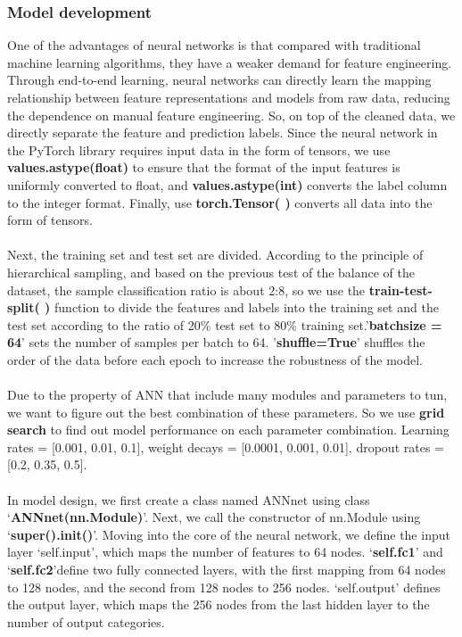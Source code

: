 \documentclass[10pt]{article}
\begin{document}
\subsubsection{Model development}
One of the advantages of neural networks is that compared with traditional machine learning algorithms, they have a weaker demand for feature engineering. Through end-to-end learning, neural networks can directly learn the mapping relationship between feature representations and models from raw data, reducing the dependence on manual feature engineering. So, on top of the cleaned data, we directly separate the feature and prediction labels. Since the neural network in the PyTorch library requires input data in the form of tensors, we use \textbf{values.astype(float)} to ensure that the format of the input features is uniformly converted to float, and \textbf{values.astype(int)} converts the label column to the integer format. Finally, use  \textbf{torch.Tensor( )} converts all data into the form of tensors.
\\\\
Next, the training set and test set are divided. According to the principle of hierarchical sampling, and based on the previous test of the balance of the dataset, the sample classification ratio is about 2:8, so we use the \textbf{train-test-split( )} function to divide the features and labels into the training set and the test set according to the ratio of 20\% test set to 80\% training set.'\textbf{batchsize = 64}' sets the number of samples per batch to 64. '\textbf{shuffle=True}' shuffles the order of the data before each epoch to increase the robustness of the model.
\\\\
Due to the property of ANN that include many modules and parameters to tun, we want to figure out the best combination of these parameters. So we use \textbf{grid search} to find out model performance on each parameter combination. Learning rates = [0.001, 0.01, 0.1], weight decays = [0.0001, 0.001, 0.01], dropout rates = [0.2, 0.35, 0.5]. 
\\\\
In model design, we first create a class named ANNnet using class ‘\textbf{ANNnet(nn.Module)}’. Next, we call the constructor of nn.Module using ‘\textbf{super().init()}’. Moving into the core of the neural network, we define the input layer ‘self.input’, which maps the number of features to 64 nodes. ‘\textbf{self.fc1}’ and ‘\textbf{self.fc2}’define two fully connected layers, with the first mapping from 64 nodes to 128 nodes, and the second from 128 nodes to 256 nodes. ‘self.output’ defines the output layer, which maps the 256 nodes from the last hidden layer to the number of output categories.
\end{document}
